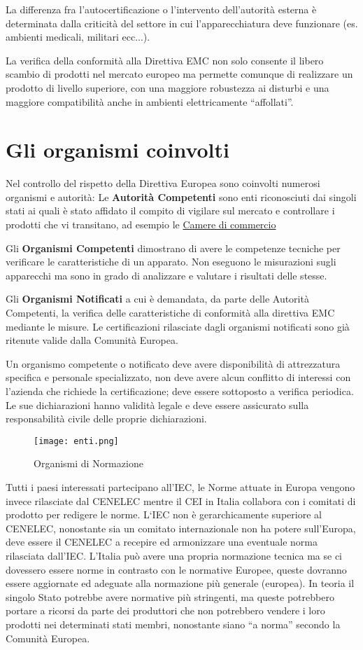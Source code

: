 La differenza fra l'autocertificazione o l'intervento dell'autorità esterna è determinata dalla criticità del settore
in cui l'apparecchiatura deve funzionare (es. ambienti medicali, militari ecc...).

La verifica della conformità alla Direttiva EMC non solo consente il libero scambio di prodotti nel mercato europeo
ma permette comunque di realizzare un prodotto di livello superiore, con una maggiore robustezza ai disturbi e una
maggiore compatibilità anche in ambienti elettricamente ``affollati''.

\section{Gli organismi coinvolti}
Nel controllo del rispetto della Direttiva Europea sono coinvolti numerosi organismi e autorità:
Le \textbf{Autorità Competenti} sono enti riconosciuti dai singoli stati ai quali è stato affidato il compito
di vigilare sul mercato e controllare i prodotti che vi transitano, ad esempio le \underline{Camere di commercio}

Gli \textbf{Organismi Competenti} dimostrano di avere le competenze tecniche per verificare le caratteristiche di un 
apparato. Non eseguono le misurazioni sugli apparecchi ma sono in grado di analizzare e valutare
i risultati delle stesse.

Gli \textbf{Organismi Notificati} a cui è demandata, da parte delle Autorità Competenti, la verifica delle
caratteristiche di conformità alla direttiva EMC mediante le misure. Le certificazioni rilasciate dagli organismi
notificati sono già ritenute valide dalla Comunità Europea.

Un organismo competente o notificato deve avere disponibilità di attrezzatura specifica e personale specializzato,
non deve avere alcun conflitto di interessi con l'azienda che richiede la certificazione; deve essere sottoposto a 
verifica periodica. Le sue dichiarazioni hanno validità legale e deve essere assicurato sulla responsabilità civile
delle proprie dichiarazioni.

\begin{figure}[h]
 \texttt{[image: enti.png]}
 \centering
 \caption{Organismi di Normazione}
 \label{fig:enti}
\end{figure}

Tutti i paesi interessati partecipano all'IEC, le Norme attuate in Europa vengono invece rilasciate dal CENELEC mentre
il CEI in Italia collabora con i comitati di prodotto per redigere le norme.
L`IEC non è gerarchicamente superiore al CENELEC, nonostante sia un comitato internazionale non ha potere
sull'Europa, deve essere il CENELEC a recepire ed armonizzare una eventuale norma rilasciata dall'IEC.
L'Italia può avere una propria normazione tecnica ma se ci dovessero essere norme in contrasto con le normative 
Europee, queste dovranno essere aggiornate ed adeguate alla normazione più generale (europea). In teoria il singolo
Stato potrebbe avere normative più stringenti, ma queste potrebbero portare a ricorsi da parte dei produttori
che non potrebbero vendere i loro prodotti nei determinati stati membri, nonostante siano ``a norma''
secondo la Comunità Europea.

